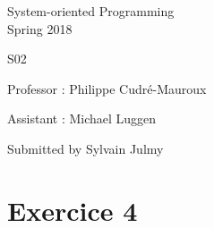 \documentclass[a4paper,11pt]{report}
\author{Sylvain Julmy}
\date{\today}
\begin{document}
\begin{center}
  \Large{
    System-oriented Programming\\
    Spring 2018
  }
  
  \noindent\makebox[\linewidth]{\rule{\linewidth}{0.4pt}}
  S02
  \noindent\makebox[\linewidth]{\rule{\linewidth}{0.4pt}}

  \begin{flushleft}
    Professor : Philippe Cudré-Mauroux

    Assistant : Michael Luggen
  \end{flushleft}
  
  \noindent\makebox[\linewidth]{\rule{\linewidth}{0.4pt}}

  Submitted by Sylvain Julmy
  
  \noindent\makebox[\linewidth]{\rule{\textwidth}{1pt}}
\end{center}

\section*{Exercice 4}
\end{document}
